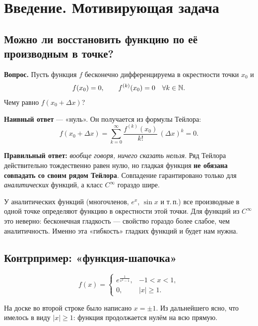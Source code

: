 
\section*{Введение. Мотивирующая задача}

\subsection*{Можно ли восстановить функцию по её производным в точке?}

\textbf{Вопрос.} Пусть функция $f$ бесконечно дифференцируема в окрестности точки $x_0$ и
\[
  f(x_0) = 0, \qquad f^{(k)}(x_0) = 0 \quad \forall k \in \mathbb{N} .
\]
Чему равно $f(x_0 + \Delta x)$?

\textbf{Наивный ответ} — «нуль». Он получается из формулы Тейлора:
\[
  f(x_0 + \Delta x) = \sum_{k=0}^{\infty} \frac{f^{(k)}(x_0)}{k!}\,(\Delta x)^k = 0 .
\]

\textbf{Правильный ответ:} \emph{вообще говоря, ничего сказать нельзя}. Ряд Тейлора
действительно тождественно равен нулю, но гладкая функция \textbf{не обязана совпадать
со своим рядом Тейлора}. Совпадение гарантировано только для \emph{аналитических}
функций, а класс $C^\infty$ гораздо шире.

\begin{idea}
У аналитических функций (многочленов, $e^x$, $\sin x$ и т.\,п.) все производные в одной
точке определяют функцию в окрестности этой точки. Для функций из $C^\infty$ это неверно:
бесконечная гладкость — свойство гораздо более слабое, чем аналитичность. Именно эта
«гибкость» гладких функций и будет нам нужна.
\end{idea}

\subsection*{Контрпример: «функция-шапочка»}

\[
  f(x) =
  \begin{cases}
    e^{\frac{1}{x^2 - 1}}, & -1 < x < 1, \\[4pt]
    0, & |x| \ge 1 .
  \end{cases}
\]

\begin{warn}
На доске во второй строке было написано $x = \pm 1$. Из дальнейшего ясно, что имелось
в виду $|x| \ge 1$: функция продолжается нулём на всю прямую.
\end{warn}

